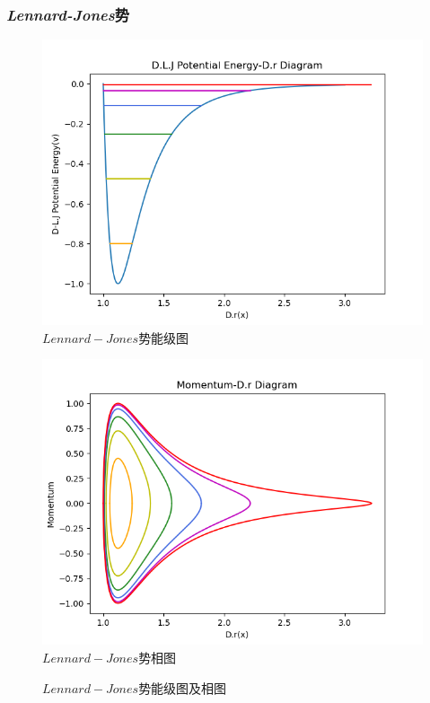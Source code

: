 \documentclass[11pt, a4paper, oneside]{ctexart}
\begin{document}
{{{\begin{appendices}
    \subsubsection{\emph{Lennard-Jones}势}
    {\newpage
        \begin{figure}[!ht]
            \caption{ $Lennard-Jones$势能级图}
            \centering
            \includegraphics[scale=0.75]{dh1.png}
        \end{figure} 
        \begin{figure}[!ht]
            \caption{ $Lennard-Jones$势相图}
	
            \centering
            \includegraphics[scale=0.75]{dh2.png}
        \end{figure} 
        \begin{figure}[!ht]
            \caption{ $Lennard-Jones$势能级图及相图}
	

\end{figure}}
\end{appendices}}}}
\end{document}
